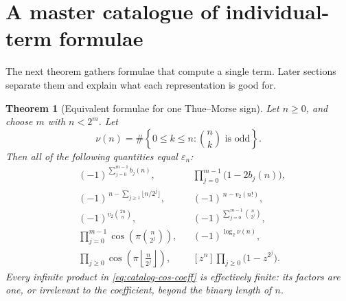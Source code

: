 \documentclass[11pt,oneside]{article}
\newtheorem{theorem}{Theorem}[section]
\theoremstyle{definition}
\theoremstyle{remark}
\newcommand{\vtwo}{v_2}
\begin{document}
\section{A master catalogue of individual-term formulae}
\label{sec:catalogue}

The next theorem gathers formulae that compute a single term.  Later sections
separate them and explain what each representation is good for.

\begin{theorem}[Equivalent formulae for one Thue--Morse sign]
\label{thm:master-catalogue}
Let \(n\ge0\), and choose \(m\) with \(n<2^m\).  Let
\begin{equation}
 \nu(n)=\#\left\{0\le k\le n:\binom nk\text{ is odd}\right\}.
 \label{eq:nu-row}
\end{equation}
Then all of the following quantities equal \(\varepsilon_n\):
\begin{align}
 &(-1)^{\sum_{j=0}^{m-1}b_j(n)},
 &&\prod_{j=0}^{m-1}\bigl(1-2b_j(n)\bigr),
 \label{eq:catalog-digits}\\
 &(-1)^{\,n-\sum_{j\ge1}\lfloor n/2^j\rfloor},
 &&(-1)^{\,n-\vtwo(n!)},
 \label{eq:catalog-floor-factorial}\\
 &(-1)^{\vtwo\binom{2n}{n}},
 &&(-1)^{\sum_{j=0}^{m-1}\binom{n}{2^j}},
 \label{eq:catalog-binomial}\\
 &\prod_{j=0}^{m-1}\cos\!\left(\pi\binom{n}{2^j}\right),
 &&(-1)^{\log_2\nu(n)},
 \label{eq:catalog-pascal}\\
 &\prod_{j\ge0}\cos\!\left(\pi\left\lfloor\frac{n}{2^j}\right\rfloor\right),
 &&[z^n]\prod_{j\ge0}\bigl(1-z^{2^j}\bigr).
 \label{eq:catalog-cos-coeff}
\end{align}
Every infinite product in \eqref{eq:catalog-cos-coeff} is effectively finite:
its factors are one, or irrelevant to the coefficient, beyond the binary
length of \(n\).
\end{theorem}
\end{document}
